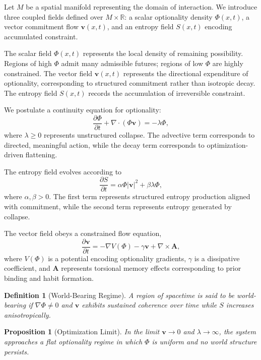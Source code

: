 \documentclass[11pt]{article}
\newtheorem{definition}{Definition}
\newtheorem{proposition}{Proposition}
\theoremstyle{remark}
\begin{document}
Let $M$ be a spatial manifold representing the domain of interaction. We introduce three coupled fields defined over $M \times \mathbb{R}$: a scalar optionality density $\Phi(x,t)$, a vector commitment flow $\mathbf{v}(x,t)$, and an entropy field $S(x,t)$ encoding accumulated constraint.

The scalar field $\Phi(x,t)$ represents the local density of remaining possibility. Regions of high $\Phi$ admit many admissible futures; regions of low $\Phi$ are highly constrained. The vector field $\mathbf{v}(x,t)$ represents the directional expenditure of optionality, corresponding to structured commitment rather than isotropic decay. The entropy field $S(x,t)$ records the accumulation of irreversible constraint.

We postulate a continuity equation for optionality:
\[
\frac{\partial \Phi}{\partial t} + \nabla \cdot (\Phi \mathbf{v}) = -\lambda \Phi ,
\]
where $\lambda \geq 0$ represents unstructured collapse. The advective term corresponds to directed, meaningful action, while the decay term corresponds to optimization-driven flattening.

The entropy field evolves according to
\[
\frac{\partial S}{\partial t} = \alpha \Phi |\mathbf{v}|^2 + \beta \lambda \Phi ,
\]
where $\alpha, \beta > 0$. The first term represents structured entropy production aligned with commitment, while the second term represents entropy generated by collapse.

The vector field obeys a constrained flow equation,
\[
\frac{\partial \mathbf{v}}{\partial t} = - \nabla V(\Phi) - \gamma \mathbf{v} + \nabla \times \mathbf{A},
\]
where $V(\Phi)$ is a potential encoding optionality gradients, $\gamma$ is a dissipative coefficient, and $\mathbf{A}$ represents torsional memory effects corresponding to prior binding and habit formation.

\begin{definition}[World-Bearing Regime]
A region of spacetime is said to be world-bearing if $\nabla \Phi \neq 0$ and $\mathbf{v}$ exhibits sustained coherence over time while $S$ increases anisotropically.
\end{definition}

\begin{proposition}[Optimization Limit]
In the limit $\mathbf{v} \to 0$ and $\lambda \to \infty$, the system approaches a flat optionality regime in which $\Phi$ is uniform and no world structure persists.
\end{proposition}
\end{document}

